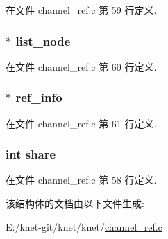在文件 channel\+\_\+ref.\+c 第 59 行定义.

\hypertarget{struct__channel__ref__t_a1077e5b0269760e53b61c2d62c5ae6a3}{}
\subsubsection[{list\+\_\+node}]{$\ast$ list\+\_\+node}\label{struct__channel__ref__t_a1077e5b0269760e53b61c2d62c5ae6a3}


在文件 channel\+\_\+ref.\+c 第 60 行定义.

\hypertarget{struct__channel__ref__t_aa3cf0e0ca3d1339d0d00bf4426a02be1}{}
\subsubsection[{ref\+\_\+info}]{$\ast$ ref\+\_\+info}\label{struct__channel__ref__t_aa3cf0e0ca3d1339d0d00bf4426a02be1}


在文件 channel\+\_\+ref.\+c 第 61 行定义.

\hypertarget{struct__channel__ref__t_a8e20e19103b7aff089f5432163078226}{}
\subsubsection[{share}]{\setlength{\rightskip}{0pt plus 5cm}int share}\label{struct__channel__ref__t_a8e20e19103b7aff089f5432163078226}


在文件 channel\+\_\+ref.\+c 第 58 行定义.



该结构体的文档由以下文件生成\+:\begin{DoxyCompactItemize}
\item 
E\+:/knet-\/git/knet/knet/\hyperlink{channel__ref_8c}{channel\+\_\+ref.\+c}\end{DoxyCompactItemize}
